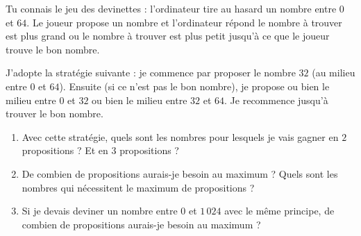 \documentclass[class=report,crop=false, 12pt]{standalone}
\begin{document}
\begin{activite}
\begin{enumerate}
  
  



\end{enumerate}

\end{activite}


\begin{activite}
Tu connais le jeu des devinettes : l'ordinateur tire au hasard un nombre entre $0$ et $64$.
Le joueur propose un nombre et l'ordinateur répond \og le nombre à trouver est plus grand \fg{} ou \og le nombre à trouver est plus petit \fg{} jusqu'à ce que le joueur trouve le bon nombre.

J'adopte la stratégie suivante : je commence par proposer le nombre $32$ (au milieu entre $0$ et $64$). Ensuite (si ce n'est pas le bon nombre), je propose ou bien le milieu entre $0$ et $32$ ou bien le milieu entre $32$ et $64$. Je recommence jusqu'à trouver le bon nombre.

\begin{enumerate}
  \item Avec cette stratégie, quels sont les nombres pour lesquels je vais gagner en $2$ propositions ? Et en $3$ propositions ?
  
  \item De combien de propositions aurais-je besoin au maximum ? 
  Quels sont les nombres qui nécessitent le maximum de propositions ?
  
  \item Si je devais deviner un nombre entre $0$ et $1\,024$ avec le même principe, de combien de propositions aurais-je besoin au maximum ?

\end{enumerate}

\end{activite}
\end{document}
